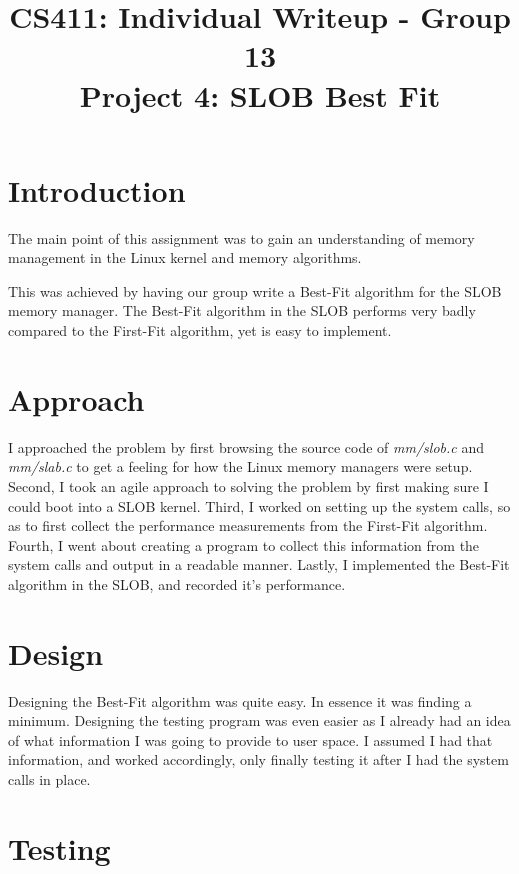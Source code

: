 \documentclass[letterpaper,10pt,titlepage]{article}
\title{CS411: Individual Writeup - Group 13\\
    Project 4: SLOB Best Fit}
\author{\name}
\begin{document}
\maketitle

\section*{Introduction}

The main point of this assignment was to gain an understanding of
memory management in the Linux kernel and memory algorithms.

This was achieved by having our group write a Best-Fit algorithm
for the SLOB memory manager. The Best-Fit algorithm in the SLOB performs
very badly compared to the First-Fit algorithm, yet is easy to
implement.

\section*{Approach}

I approached the problem by first browsing the source code of
\emph{mm/slob.c} and \emph{mm/slab.c} to get a feeling for how the Linux
memory managers were setup. Second, I took an agile approach to solving the
problem by first making sure I could boot into a SLOB kernel. Third, I
worked on setting up the system calls, so as to first collect the
performance measurements from the First-Fit algorithm. Fourth, I went
about creating a program to collect this information from the system
calls and output in a readable manner. Lastly, I implemented the
Best-Fit algorithm in the SLOB, and recorded it's performance.

\section*{Design}

Designing the Best-Fit algorithm was quite easy. In essence it was
finding a minimum. Designing the testing program was even easier as I
already had an idea of what information I was going to provide to user
space. I assumed I had that information, and worked accordingly, only
finally testing it after I had the system calls in place. 


\section*{Testing}
\end{document}
